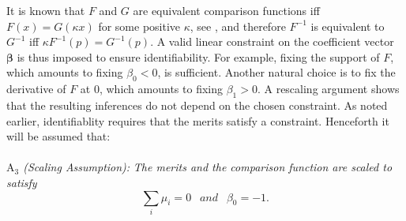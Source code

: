 \documentclass[twoside,11pt]{article}
\begin{document}
It is known that $F$ and $G$ are equivalent comparison functions iff $F(x) = G(\kappa x)$ for some positive $\kappa$, see \citet{yellott2}, and therefore $F^{-1}$ is equivalent to $G^{-1}$ iff  $\kappa F^{-1}(p) = G^{-1}(p)$.  A valid linear constraint on the coefficient vector $\boldsymbol{\beta}$ is thus imposed to ensure identifiability. For example, fixing the support of $F$, which amounts to fixing $\beta_0<0$, is sufficient. Another natural choice is to fix the derivative of $F$ at $0$, which amounts to fixing $\beta_1>0$. A rescaling argument shows that the resulting inferences do not depend on the chosen constraint. As noted earlier, identifiablity requires that the merits satisfy a constraint. Henceforth it will be assumed that: \\
\\
\textit{$\mathrm{A}_3$ (Scaling Assumption):} \textit{ The merits and the comparison function are scaled to satisfy}
\begin{equation}
\label{eq:additional_constraints}
\sum_i \mu_i = 0 \ \ \textit{ and } \ \ \beta_0 = -1.
\end{equation} 
\end{document}
